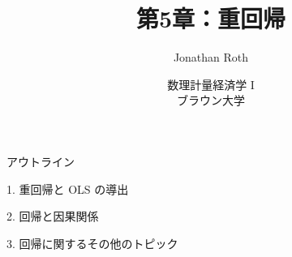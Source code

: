 \documentclass[11pt,handout]{beamer}
\begin{document}
	
	\begin{frame}[noframenumbering]{}
		\vspace{0.5cm}
		\title[]{第5章：重回帰}
		\author{Jonathan Roth}
		\date{数理計量経済学 I \\ ブラウン大学\\} 
		\titlepage {\small{}\ }\thispagestyle{empty} \vspace{-30pt}
		
	\end{frame}
	
	
	\begin{frame}{アウトライン}

	1. 重回帰と OLS の導出
	\vspace{0.8cm}
	
	2. 回帰と因果関係
	\vspace{0.8cm}
	
	3. 回帰に関するその他のトピック
	
	\end{frame}
		
\end{document}
